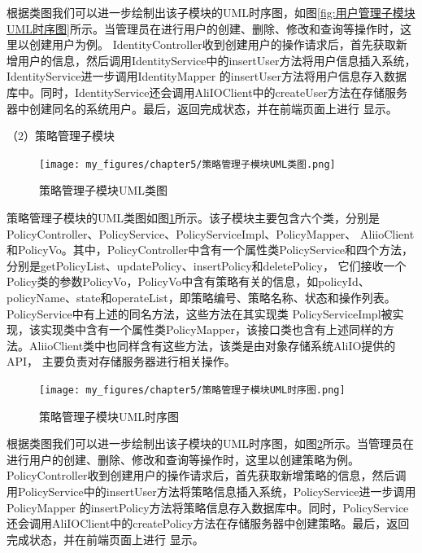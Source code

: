 根据类图我们可以进一步绘制出该子模块的UML时序图，如图\ref{fig:用户管理子模块UML时序图}所示。当管理员在进行用户的创建、删除、修改和查询等操作时，这里以创建用户为例。
IdentityController收到创建用户的操作请求后，首先获取新增用户的信息，然后调用IdentityService中的insertUser方法将用户信息插入系统，IdentityService进一步调用IdentityMapper
的insertUser方法将用户信息存入数据库中。同时，IdentityService还会调用AliIOClient中的createUser方法在存储服务器中创建同名的系统用户。最后，返回完成状态，并在前端页面上进行
显示。

（2）策略管理子模块

\begin{figure}[htb]
    \centering
    \texttt{[image: my\_figures/chapter5/策略管理子模块UML类图.png]}
    \caption{策略管理子模块UML类图}
    \label{fig:策略管理子模块UML类图}
\end{figure}

策略管理子模块的UML类图如图\ref{fig:策略管理子模块UML类图}所示。该子模块主要包含六个类，分别是PolicyController、PolicyService、PolicyServiceImpl、PolicyMapper、 
AliioClient和PolicyVo。其中，PolicyController中含有一个属性类PolicyService和四个方法，分别是getPolicyList、updatePolicy、insertPolicy和deletePolicy，
它们接收一个Policy类的参数PolicyVo，PolicyVo中含有策略有关的信息，如policyId、policyName、state和operateList，即策略编号、策略名称、状态和操作列表。
PolicyService中有上述的同名方法，这些方法在其实现类
PolicyServiceImpl被实现，该实现类中含有一个属性类PolicyMapper，该接口类也含有上述同样的方法。AliioClient类中也同样含有这些方法，该类是由对象存储系统AliIO提供的API，
主要负责对存储服务器进行相关操作。

\begin{figure}[htb]
    \centering
    \texttt{[image: my\_figures/chapter5/策略管理子模块UML时序图.png]}
    \caption{策略管理子模块UML时序图}
    \label{fig:策略管理子模块UML时序图}
\end{figure}

根据类图我们可以进一步绘制出该子模块的UML时序图，如图\ref{fig:策略管理子模块UML时序图}所示。当管理员在进行用户的创建、删除、修改和查询等操作时，这里以创建策略为例。
PolicyController收到创建用户的操作请求后，首先获取新增策略的信息，然后调用PolicyService中的insertUser方法将策略信息插入系统，PolicyService进一步调用PolicyMapper
的insertPolicy方法将策略信息存入数据库中。同时，PolicyService还会调用AliIOClient中的createPolicy方法在存储服务器中创建策略。最后，返回完成状态，并在前端页面上进行
显示。

